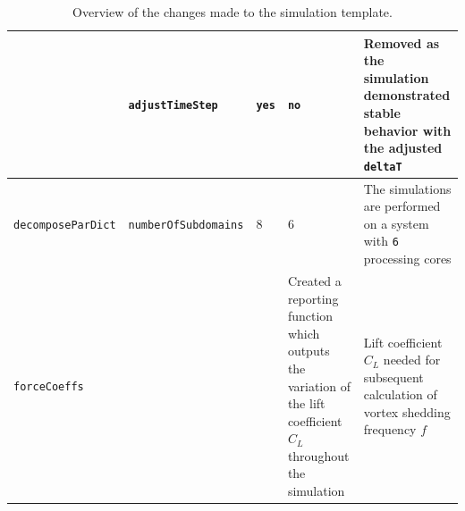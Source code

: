 \begin{table}[H]
{\begin{tabularx}{1.2\textwidth}{|p{3cm}|p{3.3cm}|p{2.8cm}|p{3cm}|X|}
			\rule{0pt}{5ex} & {\small\verb*|adjustTimeStep|} & \verb*|yes| & \verb*|no| &
			Removed as the simulation demonstrated stable behavior with the adjusted \verb*|deltaT| \parencite{jayaraj2024openfoam}
			\\ 
			
			\hline
			
			{\footnotesize\verb*|decomposeParDict|} & {\footnotesize\verb*|numberOfSubdomains|} & 8 & 6 & The simulations are performed on a system with \verb*|6| processing cores \parencite{jayaraj2024openfoam} \\
			\hline
			
			\verb*|forceCoeffs| & \textemdash & \textemdash & Created a reporting function which outputs the variation of the lift coefficient $C_L$ throughout the simulation & Lift coefficient $C_L$ needed for subsequent calculation of vortex shedding frequency $f$\\
			\hline
			
			
		\end{tabularx}
	}
	\caption{Overview of the changes made to the simulation template.}
	\label{tab:simulation_change1}
\end{table}

\begin{table}[H]
	\centering
	\renewcommand{\arraystretch}{1.3}
	\caption*{Table 1 (continued): Overview of the changes made to the simulation template.}
	\label{tab:simulation_changes2}
	
\end{table}



